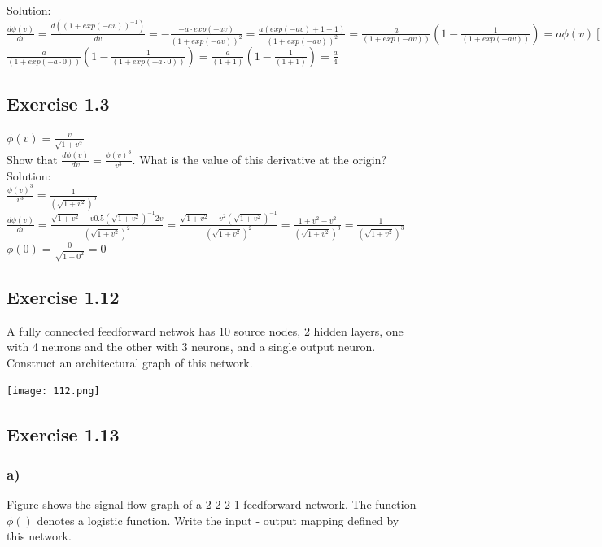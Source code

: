 \documentclass[a4paper, 12pt]{article}
\begin{document}
Solution:\\

$\frac{d\phi(v)}{dv} = \frac{d((1 + exp(-av))^{-1})}{dv} = -\frac{-a\cdot exp(-av)}{(1 + exp(-av))^2} = \frac{a(exp(-av) + 1 -1)}{(1 + exp(-av))^2} = \frac{a}{(1 + exp(-av))} (1 - \frac{1}{(1 + exp(-av))}) = a\phi(v)[1 - \phi(v)]$\\

$\frac{a}{(1 + exp(-a\cdot 0))} (1 - \frac{1}{(1 + exp(-a\cdot 0))}) = \frac{a}{(1 + 1)} (1 - \frac{1}{(1 + 1)}) = \frac{a}{4}$


\subsection{Exercise 1.3}

$\phi(v) = \frac{v}{\sqrt{1+v^2}}$\\


Show that $\frac{d\phi(v)}{dv} = \frac{\phi(v)^3}{v^3}$. What is the value of this derivative at the origin?\\

Solution:\\

$\frac{\phi(v)^3}{v^3} =\frac{1}{(\sqrt{1+v^2})^3} $\\

$\frac{d\phi(v)}{dv} = \frac{\sqrt{1+v^2}-v 0.5(\sqrt{1+v^2})^{-1}2v}{(\sqrt{1+v^2})^2} = \frac{\sqrt{1+v^2}-v^2 (\sqrt{1+v^2})^{-1}}{(\sqrt{1+v^2})^2} = \frac{1+v^2-v^2}{(\sqrt{1+v^2})^3}=\frac{1}{(\sqrt{1+v^2})^3} $\\

$\phi(0) = \frac{0}{\sqrt{1+0^2}} = 0$\\


\subsection{Exercise 1.12}

A fully connected feedforward netwok has 10 source nodes, 2 hidden layers, one with 4 neurons and the other with 3 neurons, and a single output neuron. Construct an architectural graph of this network.

\texttt{[image: 112.png]}


\subsection{Exercise 1.13}
\subsubsection{a)}
Figure shows the signal flow graph of a 2-2-2-1 feedforward network. The function $\phi()$ denotes a logistic function. Write the input - output mapping defined by this network.
\end{document}
